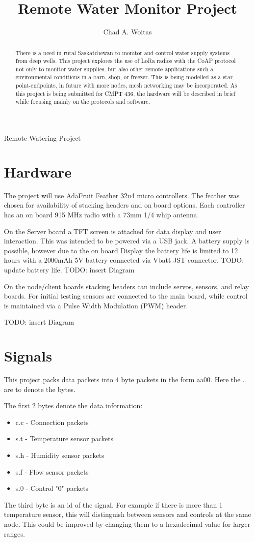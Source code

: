 \documentclass[]{report}
\title{Remote Water Monitor Project}
\author{Chad A. Woitas}
\begin{document}
\maketitle
 Remote Watering Project
\begin{abstract}
	There is a need in rural Saskatchewan to monitor and control water supply systems from deep wells. This project explores the use of LoRa radios with the CoAP protocol not only to monitor water supplies, but also other remote applications such a environmental conditions in a barn, shop, or freezer. This is being modelled as a star point-endpoints, in future with more nodes, mesh networking may be incorporated. As this project is being submitted for CMPT 436, the hardware will be described in brief while focusing mainly on the protocols and software.
\end{abstract}

\section{Hardware}
	The project will use AdaFruit Feather 32u4 micro controllers. The feather was chosen for availability of stacking headers and on board options. Each controller has an on board 915 MHz radio with a 73mm 1/4 whip antenna. 
	
	On the Server board a TFT screen is attached for data display and user interaction. This was intended to be powered via a USB jack. A battery supply is possible, however due to the on board Display the battery life is limited to 12 hours with a 2000mAh 5V battery connected via Vbatt JST connector.
	TODO: update battery life.
	TODO: insert Diagram 
	
	On the node/client boards stacking headers can include servos, sensors, and relay boards. For initial testing sensors are connected to the main board, while control is maintained via a Pulse Width Modulation (PWM) header. 
	
	TODO: insert Diagram
	
\section{Signals}	
	This project packs data packets into 4 byte packets in the form aa00. Here the . are to denote the bytes.
	
	The first 2 bytes denote the data information:
	\begin{itemize}
		\item c.c - Connection packets 
		\item s.t - Temperature sensor packets
		\item s.h - Humidity sensor packets
		\item s.f - Flow sensor packets
		\item s.0 - Control "0" packets
		
	\end{itemize}	
	The third byte is an id of the signal. For example if there is more than 1 temperature sensor, this will distinguish between sensors and controls at the same node. This could be improved by changing them to a hexadecimal value for larger ranges.
\end{document}
